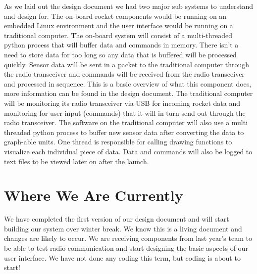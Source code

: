 \documentclass[10pt,draftclsnofoot,onecolumn]{IEEEtran}
\begin{document}
As we laid out the design document we had two major sub systems to understand and design for. The on-board rocket components would be running on an embedded Linux environment and the user interface would be running on a traditional computer. The on-board system will consist of a multi-threaded python process that will buffer data and commands in memory. There isn't a need to store data for too long so any data that is buffered will be processed quickly. Sensor data will be sent in a packet to the traditional computer through the radio transceiver and commands will be received from the radio transceiver and processed in sequence. This is a basic overview of what this component does, more information can be found in the design document. The traditional computer will be monitoring its radio transceiver via USB for incoming rocket data and monitoring for user input (commands) that it will in turn send out through the radio transceiver. The software on the traditional computer will also use a multi threaded python process to buffer new sensor data after converting the data to graph-able units. One thread is responsible for calling drawing functions to visualize each individual piece of data. Data and commands will also be logged to text files to be viewed later on after the launch. \par
\section{Where We Are Currently}
We have completed the first version of our design document and will start building our system over winter break. We know this is a living document and changes are likely to occur. We are receiving components from last year's team to be able to test radio communication and start designing the basic aspects of our user interface. We have not done any coding this term, but coding is about to start! \par
\end{document}
